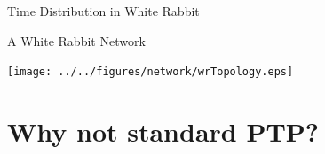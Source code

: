 \documentclass[compress,red]{beamer}
\begin{document}
\begin{frame}{Time Distribution in White Rabbit}

\center A White Rabbit Network
  \begin{center}
  \texttt{[image: ../../figures/network/wrTopology.eps]}
  \end{center}
\end{frame}
\section{Why not standard PTP?}
\end{document}
